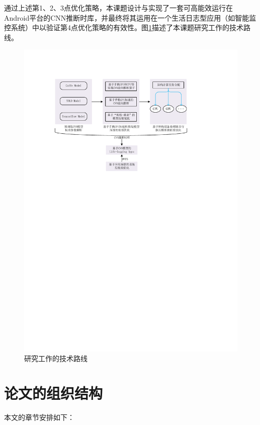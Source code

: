 通过上述第1、2、3点优化策略，本课题设计与实现了一套可高能效运行在Android平台的CNN推断时库，并最终将其运用在一个生活日志型应用（如智能监控系统）中以验证第4点优化策略的有效性。图\ref{figure:figurework}描述了本课题研究工作的技术路线。

\begin{figure}[htbp]
    \begin{center}
    \includegraphics[width=1.0\textwidth]{figures/work.pdf}
    \end{center}
    \caption{研究工作的技术路线}\label{figure:figurework}
\end{figure}

\section{论文的组织结构}

本文的章节安排如下：

